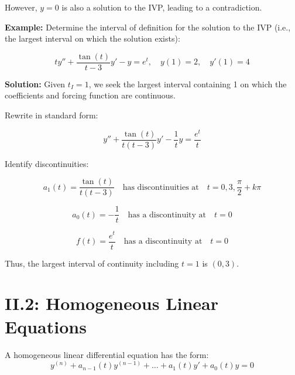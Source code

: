 \documentclass{article}
\begin{document}
However, \(y = 0\) is also a solution to the IVP, leading to a contradiction.

\textbf{Example:} Determine the interval of definition for the solution to the IVP (i.e., the largest interval on which the solution exists):

\[
t y'' + \frac{\tan(t)}{t-3} y' - y = e^t, \quad y(1) = 2, \quad y'(1) = 4
\]

\textbf{Solution:} Given \(t_I = 1\), we seek the largest interval containing 1 on which the coefficients and forcing function are continuous.

Rewrite in standard form:

\[
y'' + \frac{\tan(t)}{t(t-3)} y' - \frac{1}{t} y = \frac{e^t}{t}
\]

Identify discontinuities:

\[
a_1(t) = \frac{\tan(t)}{t(t-3)} \quad \text{has discontinuities at} \quad t = 0, 3, \frac{\pi}{2} + k\pi
\]

\[
a_0(t) = -\frac{1}{t} \quad \text{has a discontinuity at} \quad t = 0
\]

\[
f(t) = \frac{e^t}{t} \quad \text{has a discontinuity at} \quad t = 0
\]

\begin{center}
\end{center}

Thus, the largest interval of continuity including \(t = 1\) is \((0, 3)\).



\section*{II.2: Homogeneous Linear Equations}

A homogeneous linear differential equation has the form:
\[
y^{(n)} + a_{n-1}(t)y^{(n-1)} + \dots + a_1(t)y' + a_0(t)y = 0
\]
\end{document}
